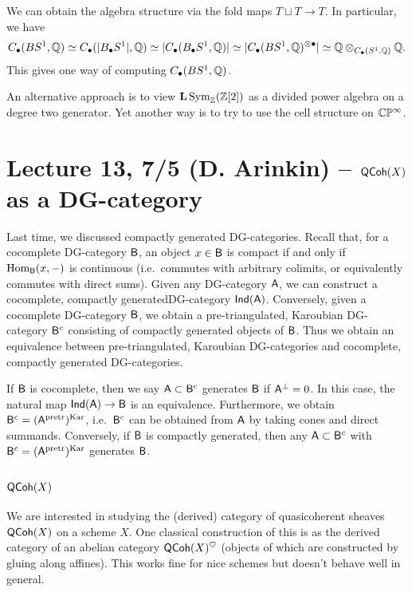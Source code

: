 \documentclass{amsart}
\begin{document}
We can obtain the algebra structure via the fold maps $T \sqcup T \to T$.
In particular, we have
\[
	C_\bullet(BS^1, \mathbb{Q}) \simeq C_\bullet(|B_\bullet S^1|, \mathbb{Q}) \simeq |C_\bullet(B_\bullet S^1, \mathbb{Q})| \simeq |C_\bullet(BS^1, \mathbb{Q})^{\otimes \bullet}| \simeq \mathbb{Q} \otimes_{C_\bullet(S^1, \mathbb{Q})} \mathbb{Q}.
\]
This gives one way of computing $C_\bullet(BS^1, \mathbb{Q})$.

An alternative approach is to view $\mathbf{L} \operatorname{Sym}_{\mathbb{Z}}(\mathbb{Z}[2])$ as a divided power algebra on a degree two generator.
Yet another way is to try to use the cell structure on $\mathbb{C}\mathbb{P}^\infty$.

\section{Lecture 13, 7/5 (D. Arinkin) -- $\mathsf{QCoh}(X)$ as a DG-category}

Last time, we discussed compactly generated DG-categories.
Recall that, for a cocomplete DG-category $\mathsf{B}$, an object $x \in \mathsf{B}$ is compact if and only if $\operatorname{Hom}_{\mathsf{B}}(x, -)$ is continuous (i.e.\ commutes with arbitrary colimits, or equivalently commutes with direct sums).
Given any DG-category $\mathsf{A}$, we can construct a cocomplete, compactly generatedDG-category $\mathsf{Ind}(\mathsf{A})$.
Conversely, given a cocomplete DG-category $\mathsf{B}$, we obtain a pre-triangulated, Karoubian DG-category $\mathsf{B}^c$ consisting of compactly generated objects of $\mathsf{B}$.
Thus we obtain an equivalence between pre-triangulated, Karoubian DG-categories and cocomplete, compactly generated DG-categories.

If $\mathsf{B}$ is cocomplete, then we say $\mathsf{A} \subset \mathsf{B}^c$ generates $\mathsf{B}$ if $\mathsf{A}^\perp = 0$.
In this case, the natural map $\mathsf{Ind}(\mathsf{A}) \to \mathsf{B}$ is an equivalence.
Furthermore, we obtain $\mathsf{B}^c = (\mathsf{A}^{\mathrm{pretr}})^{\mathrm{Kar}}$, i.e.\ $\mathsf{B}^c$ can be obtained from $\mathsf{A}$ by taking cones and direct summands.
Conversely, if $\mathsf{B}$ is compactly generated, then any $\mathsf{A} \subset \mathsf{B}^c$ with $\mathsf{B}^c = (\mathsf{A}^{\mathrm{pretr}})^{\mathrm{Kar}}$ generates $\mathsf{B}$.

\subsection{$\mathsf{QCoh}(X)$}

We are interested in studying the (derived) category of quasicoherent sheaves $\mathsf{QCoh}(X)$ on a scheme $X$.
One classical construction of this is as the derived category of an abelian category $\mathsf{QCoh}(X)^\heartsuit$ (objects of which are constructed by gluing along affines).
This works fine for nice schemes but doesn't behave well in general.
\end{document}
